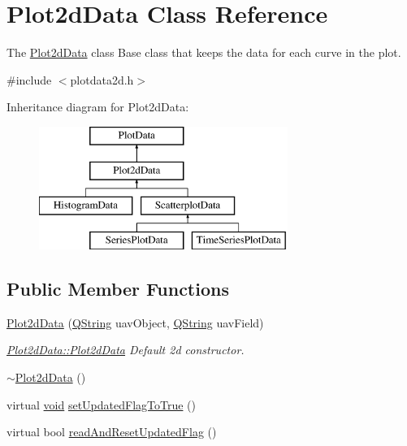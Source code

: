\hypertarget{class_plot2d_data}{\section{\-Plot2d\-Data \-Class \-Reference}
\label{class_plot2d_data}
}


\-The \hyperlink{class_plot2d_data}{\-Plot2d\-Data} class \-Base class that keeps the data for each curve in the plot.  




{\ttfamily \#include $<$plotdata2d.\-h$>$}

\-Inheritance diagram for \-Plot2d\-Data\-:\begin{figure}[H]
\begin{center}
\leavevmode
\includegraphics[height=4.000000cm]{class_plot2d_data}
\end{center}
\end{figure}
\subsection*{\-Public \-Member \-Functions}
\begin{DoxyCompactItemize}
\item 
\hyperlink{group___scope_plugin_ga47355d48ebe2a3f10f3eeb8c885d91d2}{\-Plot2d\-Data} (\hyperlink{group___u_a_v_objects_plugin_gab9d252f49c333c94a72f97ce3105a32d}{\-Q\-String} uav\-Object, \hyperlink{group___u_a_v_objects_plugin_gab9d252f49c333c94a72f97ce3105a32d}{\-Q\-String} uav\-Field)
\begin{DoxyCompactList}\small\item\em \hyperlink{group___scope_plugin_ga47355d48ebe2a3f10f3eeb8c885d91d2}{\-Plot2d\-Data\-::\-Plot2d\-Data} \-Default 2d constructor. \end{DoxyCompactList}\item 
\hyperlink{group___scope_plugin_ga7e60665e7c88b1df55cfefe356d8ee27}{$\sim$\-Plot2d\-Data} ()
\item 
virtual \hyperlink{group___u_a_v_objects_plugin_ga444cf2ff3f0ecbe028adce838d373f5c}{void} \hyperlink{group___scope_plugin_ga8cf81c5a6f87fc1c97b0054f2cb23f90}{set\-Updated\-Flag\-To\-True} ()
\item 
virtual bool \hyperlink{group___scope_plugin_ga5fe24bb29fc32dfa2f955383dc96877e}{read\-And\-Reset\-Updated\-Flag} ()
\end{DoxyCompactItemize}
